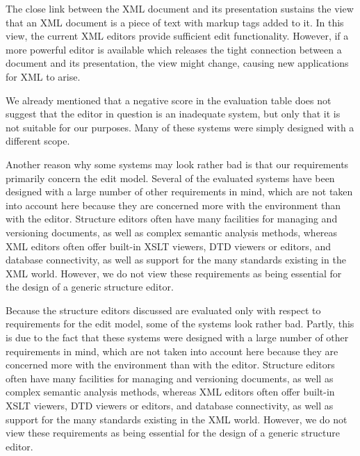 \documentclass{speauth}
\begin{document}
The close link between the XML document and its presentation sustains the view that an XML document is a piece of text with markup tags added to it. In this view, the current XML editors provide sufficient edit functionality. However, if a more powerful editor is available which releases the tight connection between a document and its presentation, the view might change, causing new applications for XML to arise.


\bigskip
{}


We already mentioned that a negative score in the evaluation table does not suggest that the editor in question is an inadequate system, but only that it is not suitable for our purposes. Many of these systems were simply designed with a different scope.

Another reason why some systems may look rather bad is that our requirements primarily concern the edit model. Several of the evaluated systems have been designed with a large number of other requirements in mind, which are not taken into account here because they are concerned more with the environment than with the editor. Structure editors often have many facilities for managing and versioning documents, as well as complex semantic analysis methods, whereas XML editors often offer built-in XSLT viewers, DTD viewers or editors, and database connectivity, as well as support for the many standards existing in the XML world. However, we do not view these requirements as being essential for the design of a generic structure editor.


\bc
Because the structure editors discussed are evaluated only with respect to requirements for the edit model, some of the systems look rather bad. Partly, this is due to the fact that these systems were designed with a large number of other requirements in mind, which are not taken into account here because they are concerned more with the environment than with the editor. Structure editors often have many facilities for managing and versioning documents, as well as complex semantic analysis methods, whereas XML editors often offer built-in XSLT viewers, DTD viewers or editors, and database connectivity, as well as support for the many standards existing in the XML world. However, we do not view these requirements as being essential for the design of a generic structure editor.
\ec
\end{document}
